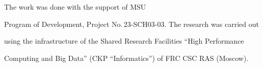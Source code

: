 \vspace*{-12pt}








    


      \Ack





\vspace*{-3pt}





\noindent


The work was done with the support of MSU 


Program of Development, Project No.\,23-SCH03-03. The research was carried out 


using the infrastructure of the Shared Research Facilities ``High Performance 


Computing and Big Data'' (CKP ``Informatics'') of FRC CSC RAS (Moscow).








